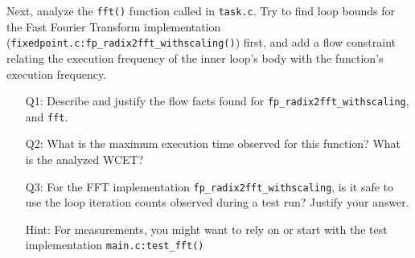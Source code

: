 \label{problem:4}

Next, analyze the \texttt{fft()} function called in \texttt{task.c}. Try to
find loop bounds for the Fast Fourier Transform implementation
(\texttt{fixedpoint.c:fp\_radix2fft\_withscaling()}) first, and add a flow
constraint relating the execution frequency of the inner loop's body with
the function's execution frequency.

\begin{itemize}

\item[Q1:]
  Describe and justify the flow facts found for
  \texttt{fp\_radix2fft\_withscaling}, and \texttt{fft}.

\item[Q2:]
  What is the maximum execution time observed for this function? What
  is the analyzed WCET?

\item[Q3:]
  For the FFT implementation \texttt{fp\_radix2fft\_withscaling}, is it safe to
  use the loop iteration counts observed during a test run? Justify your
  answer.

\item[Hint:]
  For measurements, you might want to rely on or start with the test
  implementation \texttt{main.c:test\_fft()}

\end{itemize}
